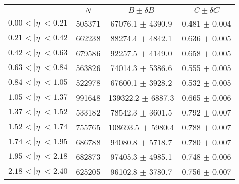 \begin{tabular}{lccc}
\hline
    &   $N$   & $B \pm \delta B$  &  $C \pm \delta C$ \\
\hline
$0.00 < |\eta| <0.21$          & 505371     & 67076.1    $\pm$ 4390.9 & 0.481      $\pm$ 0.004 \\
$0.21 < |\eta| <0.42$          & 662238     & 88274.4    $\pm$ 4842.1 & 0.636      $\pm$ 0.005 \\
$0.42 < |\eta| <0.63$          & 679586     & 92257.5    $\pm$ 4149.0 & 0.658      $\pm$ 0.005 \\
$0.63 < |\eta| <0.84$          & 563826     & 74014.3    $\pm$ 5386.6 & 0.555      $\pm$ 0.005 \\
$0.84 < |\eta| <1.05$          & 522978     & 67600.1    $\pm$ 3928.2 & 0.532      $\pm$ 0.005 \\
$1.05 < |\eta| <1.37$          & 991648     & 139322.2   $\pm$ 6887.3 & 0.665      $\pm$ 0.006 \\
$1.37 < |\eta| <1.52$          & 533182     & 78542.3    $\pm$ 3601.5 & 0.792      $\pm$ 0.007 \\
$1.52 < |\eta| <1.74$          & 755765     & 108693.5   $\pm$ 5980.4 & 0.788      $\pm$ 0.007 \\
$1.74 < |\eta| <1.95$          & 686788     & 94080.8    $\pm$ 5718.7 & 0.780      $\pm$ 0.007 \\
$1.95 < |\eta| <2.18$          & 682873     & 97405.3    $\pm$ 4985.1 & 0.748      $\pm$ 0.006 \\
$2.18 < |\eta| <2.40$          & 625205     & 96102.8    $\pm$ 3780.7 & 0.756      $\pm$ 0.007 \\
\hline
\end{tabular}

